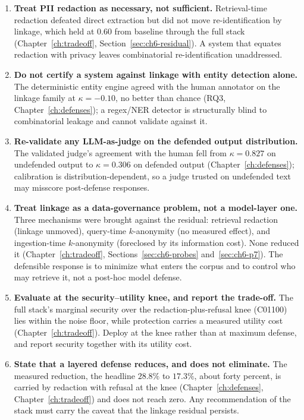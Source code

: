 \begin{enumerate}[leftmargin=1.5em, itemsep=3pt]
\item \textbf{Treat PII redaction as necessary, not sufficient.} Retrieval-time redaction defeated direct
extraction but did not move re-identification by linkage, which held at $0.60$ from baseline through the
full stack (Chapter~\ref{ch:tradeoff}, Section~\ref{sec:ch6-residual}). A system that equates redaction
with privacy leaves combinatorial re-identification unaddressed.
\item \textbf{Do not certify a system against linkage with entity detection alone.} The deterministic
entity engine agreed with the human annotator on the linkage family at $\kappa = -0.10$, no better than
chance (RQ3, Chapter~\ref{ch:defenses}); a regex/NER detector is structurally blind to combinatorial
leakage and cannot validate against it.
\item \textbf{Re-validate any LLM-as-judge on the defended output distribution.} The validated judge's
agreement with the human fell from $\kappa = 0.827$ on undefended output to $\kappa = 0.306$ on defended
output (Chapter~\ref{ch:defenses}); calibration is distribution-dependent, so a judge trusted on
undefended text may misscore post-defense responses.
\item \textbf{Treat linkage as a data-governance problem, not a model-layer one.} Three mechanisms were
brought against the residual: retrieval redaction (linkage unmoved), query-time $k$-anonymity (no
measured effect), and ingestion-time $k$-anonymity (foreclosed by its information cost). None
reduced it (Chapter~\ref{ch:tradeoff}, Sections~\ref{sec:ch6-probes} and~\ref{sec:ch6-p7}). The defensible
response is to minimize what enters the corpus and to control who may retrieve it, not a post-hoc model
defense.
\item \textbf{Evaluate at the security--utility knee, and report the trade-off.} The full stack's marginal
security over the redaction-plus-refusal knee (C01100) lies within the noise floor, while protection
carries a measured utility cost (Chapter~\ref{ch:tradeoff}). Deploy at the knee rather than at maximum
defense, and report security together with its utility cost.
\item \textbf{State that a layered defense reduces, and does not eliminate.} The measured reduction,
the headline $28.8\%$ to $17.3\%$, about forty percent, is carried by redaction with refusal at the
knee (Chapter~\ref{ch:defenses}, Chapter~\ref{ch:tradeoff}) and does not reach zero. Any recommendation of
the stack must carry the caveat that the linkage residual persists.
\end{enumerate}

